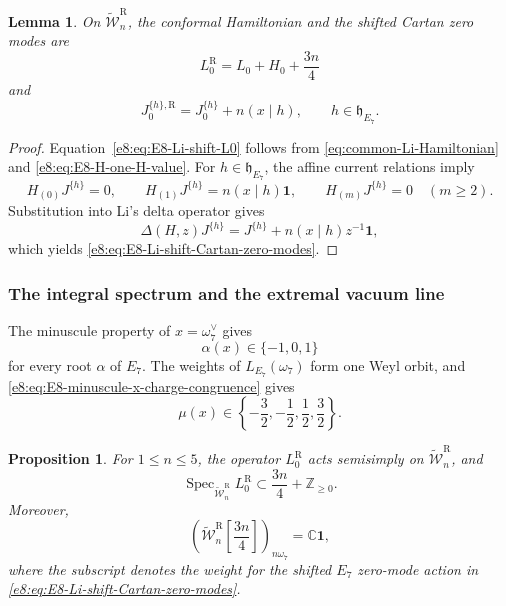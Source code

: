 \documentclass[11pt,reqno]{amsart}
\newtheorem{lemma}[theorem]{Lemma}
\newtheorem{proposition}[theorem]{Proposition}
\theoremstyle{definition}
\theoremstyle{remark}
\providecommand{\C}{\mathbb{C}}
\providecommand{\Z}{\mathbb{Z}}
\providecommand{\Vac}{\mathbf{1}}
\providecommand{\W}{\mathcal{W}}
\providecommand{\Spec}{\operatorname{Spec}}
\begin{document}
\begin{lemma}

On $\widetilde{\W}_n^{\mathrm R}$, the conformal Hamiltonian and the shifted
Cartan zero modes are
\begin{equation}
  L_0^{\mathrm R}=L_0+H_0+\frac{3n}{4}
  \label{e8:eq:E8-Li-shift-L0}
\end{equation}
and
\begin{equation}
  J_0^{\{h\},\mathrm R}
  =J_0^{\{h\}}+n(x\mid h),
  \qquad h\in\mathfrak h_{E_7}.
  \label{e8:eq:E8-Li-shift-Cartan-zero-modes}
\end{equation}
\end{lemma}

\begin{proof}
Equation~\eqref{e8:eq:E8-Li-shift-L0} follows from
\eqref{eq:common-Li-Hamiltonian} and
\eqref{e8:eq:E8-H-one-H-value}.  For $h\in\mathfrak h_{E_7}$, the affine
current relations imply
\begin{equation*}
  H_{(0)}J^{\{h\}}=0,
  \qquad
  H_{(1)}J^{\{h\}}=n(x\mid h)\Vac,
  \qquad
  H_{(m)}J^{\{h\}}=0\quad(m\ge2).
\end{equation*}
Substitution into Li's delta operator gives
\begin{equation*}
  \Delta(H,z)J^{\{h\}}
  =J^{\{h\}}+n(x\mid h)z^{-1}\Vac,
\end{equation*}
which yields \eqref{e8:eq:E8-Li-shift-Cartan-zero-modes}.
\end{proof}

\subsubsection{The integral spectrum and the extremal vacuum line}


The minuscule property of $x=\omega_7^\vee$ gives
\begin{equation}
  \alpha(x)\in\{-1,0,1\}
  \label{e8:eq:E8-root-x-charges}
\end{equation}
for every root $\alpha$ of $E_7$.  The weights of
$L_{E_7}(\omega_7)$ form one Weyl orbit, and
\eqref{e8:eq:E8-minuscule-x-charge-congruence} gives
\begin{equation}
  \mu(x)\in
  \left\{-\frac32,-\frac12,\frac12,\frac32\right\}.
  \label{e8:eq:E8-minuscule-x-charges}
\end{equation}

\begin{proposition}
\label{e8:prop:E8-Ramond-spectrum-vacuum-line}
For $1\le n\le5$, the operator $L_0^{\mathrm R}$ acts semisimply on
$\widetilde{\W}_n^{\mathrm R}$, and
\begin{equation}
  \Spec_{\widetilde{\W}_n^{\mathrm R}}L_0^{\mathrm R}
  \subset \frac{3n}{4}+\Z_{\ge0}.
  \label{e8:eq:E8-Ramond-integral-spectrum}
\end{equation}
Moreover,
\begin{equation}
  \left(\widetilde{\W}_n^{\mathrm R}
  \left[\frac{3n}{4}\right]\right)_{n\omega_7}
  =\C\Vac,
  \label{e8:eq:E8-extremal-vacuum-line}
\end{equation}
where the subscript denotes the weight for the shifted $E_7$ zero-mode
action in \eqref{e8:eq:E8-Li-shift-Cartan-zero-modes}.
\end{proposition}
\end{document}
